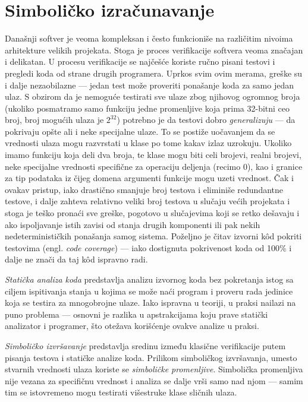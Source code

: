 \section{Simboličko izračunavanje}
\label{sec:Symbolics}

Današnji softver je veoma kompleksan i često funkcioniše na različitim nivoima arhitekture velikih projekata. Stoga je proces verifikacije softvera veoma značajan i delikatan. U procesu verifikacije se najčešće koriste ručno pisani testovi i pregledi koda od strane drugih programera. Uprkos svim ovim merama, greške su i dalje nezaobilazne --- jedan test može proveriti ponašanje koda za samo jedan ulaz. S obzirom da je nemoguće testirati sve ulaze zbog njihovog ogromnog broja (ukoliko posmatramo samo funkciju jedne promenljive koja prima 32-bitni ceo broj, broj mogućih ulaza je $2^{32}$) potrebno je da testovi dobro \emph{generalizuju} --- da pokrivaju opšte ali i neke specijalne ulaze. To se postiže uočavanjem da se vrednosti ulaza mogu razvrstati u klase po tome kakav izlaz uzrokuju. Ukoliko imamo funkciju koja deli dva broja, te klase mogu biti celi brojevi, realni brojevi, neke specijalne vrednosti specifične za operaciju deljenja (recimo $0$), kao i granice za tip podataka iz čijeg domena argumenti funkcije mogu uzeti vrednost. Čak i ovakav pristup, iako drastično smanjuje broj testova i eliminiše redundantne testove, i dalje zahteva relativno veliki broj testova u slučaju većih projekata i stoga je teško pronaći sve greške, pogotovo u slučajevima koji se retko dešavaju i ako ispoljavanje istih zavisi od stanja drugih komponenti ili pak nekih nedeterminističkih ponašanja samog sistema. Poželjno je čitav izvorni k\^od pokriti  testovima (engl. \emph{code coverage}) --- iako dostignuta pokrivenost koda od 100\% i dalje ne znači da taj k\^od ispravno radi.

\emph{Statička analiza koda} predstavlja analizu izvornog koda bez pokretanja istog sa ciljem ispitivanja stanja u kojima se može naći program i proveru rada jedinice koja se testira za mnogobrojne ulaze. Iako ispravna u teoriji, u praksi nailazi na puno problema --- osnovni je razlika u apstrakcijama koju prave statički analizator i programer, što otežava korišćenje ovakve analize u praksi.

\emph{Simboličko izvršavanje} \cite{SymbolicExecution} predstavlja sredinu između klasične verifikacije putem pisanja testova i statičke analize koda. Prilikom simboličkog izvršavanja, umesto stvarnih vrednosti ulaza koriste se \emph{simboličke promenljive}. Simbolička promenljiva nije vezana za specifičnu vrednost i analiza se dalje vrši samo nad njom --- samim tim se istovremeno mogu testirati višestruke klase sličnih ulaza. 

